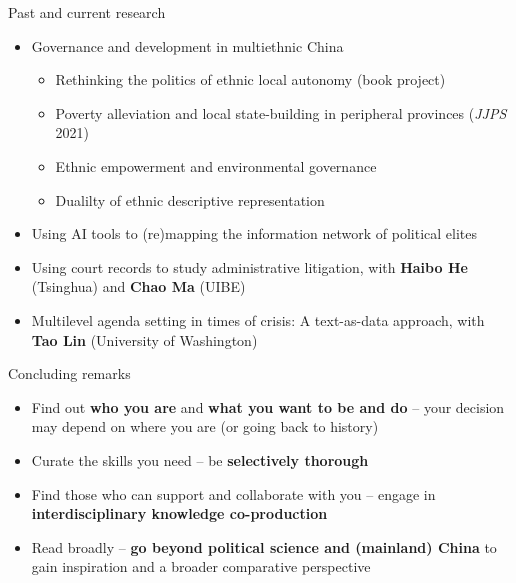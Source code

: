 \documentclass[
  10pt,
  ignorenonframetext,
]{beamer}
\begin{document}
\begin{frame}{Past and current research}
\label{past-and-current-research}
\begin{itemize}
  \item Governance and development in multiethnic China
  \vspace{0.1cm}
  \begin{itemize}
    \item Rethinking the politics of ethnic local autonomy (book project)
    \item Poverty alleviation and local state-building in peripheral provinces (\textit{JJPS} 2021)
    \item Ethnic empowerment and environmental governance
    \item Dualilty of ethnic descriptive representation
  \end{itemize}
  \vspace{0.2cm}
  \item Using AI tools to (re)mapping the information network of political elites
  \vspace{0.2cm}
  \item Using court records to study administrative litigation, with \textbf{Haibo He} (Tsinghua) and \textbf{Chao Ma} (UIBE)
  \vspace{0.2cm}
  \item Multilevel agenda setting in times of crisis: A text-as-data approach, with \textbf{Tao Lin} (University of Washington)
\end{itemize}
\end{frame}

\begin{frame}{Concluding remarks}
\label{concluding-remarks}
\begin{itemize}
  \item Find out \textbf{who you are} and \textbf{what you want to be and do} -- your decision may depend on where you are (or going back to history)
  \vspace{0.6cm}
  \item Curate the skills you need -- be \textbf{selectively thorough}
  \vspace{0.6cm}
  \item Find those who can support and collaborate with you -- engage in \textbf{interdisciplinary knowledge co-production}
  \vspace{0.6cm}
  \item Read broadly -- \textbf{go beyond political science and (mainland) China} to gain inspiration and a broader comparative perspective
\end{itemize}
\end{frame}
\end{document}
